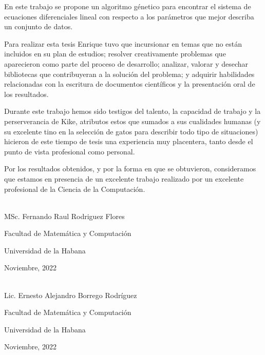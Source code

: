 \begin{opinion}
    En este trabajo se propone un algoritmo génetico para encontrar el sistema de ecuaciones diferenciales lineal con respecto a los parámetros que mejor describa un conjunto de datos.

    Para realizar esta tesis Enrique tuvo que incursionar en temas que no están incluidos en su plan de estudios; resolver creativamente problemas que aparecieron como parte del proceso de desarrollo; analizar, valorar y desechar bibliotecas que contribuyeran a la solución del problema; y adquirir habilidades relacionadas con la escritura de documentos científicos y la presentación oral de los resultados.

    Durante este trabajo hemos sido testigos del talento, la capacidad de trabajo y la perserverancia de Kike, atributos estos que sumados a sus cualidades humanas (y su excelente tino en la selección de gatos para describir todo tipo de situaciones) hicieron de este tiempo de tesis una experiencia muy placentera, tanto desde el punto de vista profesional como personal.

    Por los resultados obtenidos, y por la forma en que se obtuvieron,  consideramos que estamos en presencia de un excelente trabajo realizado por un excelente profesional de la Ciencia de la Computación.



    \begin{flushright}
        \underline{\hspace{6.5cm}}\\
        MSc. Fernando Raul Rodriguez Flores

        Facultad de Matemática y Computación

        Universidad de la Habana

        Noviembre, 2022
    \end{flushright}

    \begin{flushright}
        \underline{\hspace{6.5cm}}\\
        Lic. Ernesto Alejandro Borrego Rodríguez

        Facultad de Matemática y Computación

        Universidad de la Habana

        Noviembre, 2022
    \end{flushright}

\end{opinion}

